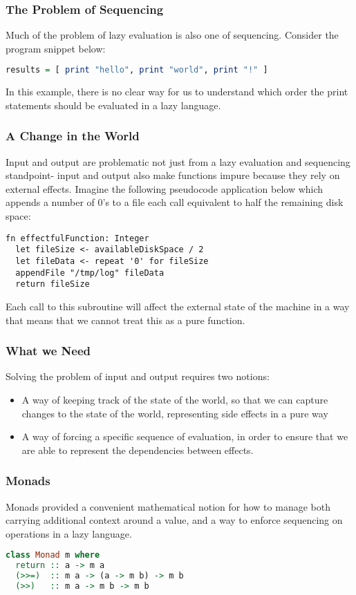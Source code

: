 \documentclass{beamer}
\begin{document}
\begin{frame}[fragile]
  \frametitle{The Problem of Sequencing}
  Much of the problem of lazy evaluation is also one of sequencing.  Consider the program snippet below:
\begin{lstlisting}[language=haskell]
results = [ print "hello", print "world", print "!" ]
\end{lstlisting}
  In this example, there is no clear way for us to understand which
  order the print statements should be evaluated in a lazy language.
\end{frame}

\begin{frame}[fragile]
  \frametitle{A Change in the World}
  Input and output are problematic not just from a lazy evaluation and
  sequencing standpoint- input and output also make functions impure
  because they rely on external effects.  Imagine the following
  pseudocode application below which appends a number of 0's to a file
  each call equivalent to half the remaining disk space:

\begin{lstlisting}
fn effectfulFunction: Integer
  let fileSize <- availableDiskSpace / 2
  let fileData <- repeat '0' for fileSize
  appendFile "/tmp/log" fileData
  return fileSize
\end{lstlisting}

  Each call to this subroutine will affect the external state of the
  machine in a way that means that we cannot treat this as a pure
  function.
\end{frame}
\begin{frame}
  \frametitle{What we Need}
  Solving the problem of input and output requires two notions:
  \begin{itemize}
  \item A way of keeping track of the state of the world, so that we
    can capture changes to the state of the world, representing side
    effects in a pure way
  \item A way of forcing a specific sequence of evaluation, in order
    to ensure that we are able to represent the dependencies between
    effects.
  \end{itemize}
\end{frame}

\begin{frame}[fragile]
  \frametitle{Monads}
  Monads provided a convenient mathematical notion for how to manage
  both carrying additional context around a value, and a way to
  enforce sequencing on operations in a lazy language.

\begin{lstlisting}[language=haskell]
class Monad m where
  return :: a -> m a
  (>>=)  :: m a -> (a -> m b) -> m b
  (>>)   :: m a -> m b -> m b
\end{lstlisting}
\end{frame}
\end{document}
